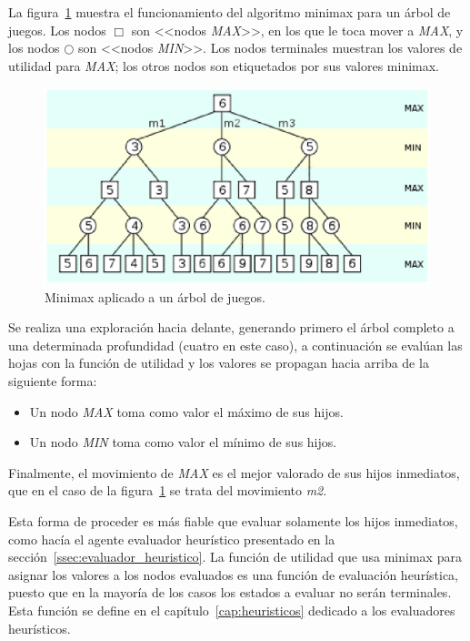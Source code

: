 La figura~\ref{fig:minimax} muestra el funcionamiento del algoritmo minimax para un árbol de juegos.
Los nodos $\Box$ son <<nodos \textit{MAX}>>, en los que le toca mover a \textit{MAX}, y los nodos $\bigcirc$ son <<nodos \textit{MIN}>>.
Los nodos terminales muestran los valores de utilidad para \textit{MAX}; los otros nodos son etiquetados por sus valores minimax.

\begin{figure}[h]
	\centering
	\includegraphics[scale=0.8]{contenido/cap3/imagenes/minimax.eps}
	\caption{Minimax aplicado a un árbol de juegos.}
	\label{fig:minimax}
\end{figure}

Se realiza una exploración hacia delante, generando primero el árbol completo a una determinada profundidad (cuatro en este caso), a continuación se evalúan las hojas con la función de utilidad y los valores se propagan hacia arriba de la siguiente forma:
\begin{itemize}
\renewcommand{\labelitemi}{-}
	\item Un nodo \textit{MAX} toma como valor el máximo de sus hijos.
	\item Un nodo \textit{MIN} toma como valor el mínimo de sus hijos.
\end{itemize}
Finalmente, el movimiento de \textit{MAX} es el mejor valorado de sus hijos inmediatos, que en el caso de la figura~\ref{fig:minimax} se trata del movimiento \textit{m2}.

Esta forma de proceder es más fiable que evaluar solamente los hijos inmediatos, como hacía el agente evaluador heurístico presentado en la sección~\ref{ssec:evaluador_heuristico}.
La función de utilidad que usa minimax para asignar los valores a los nodos evaluados es una función de evaluación heurística, puesto que en la mayoría de los casos los estados a evaluar no serán terminales.
Esta función se define en el capítulo~\ref{cap:heuristicos} dedicado a los evaluadores heurísticos.

